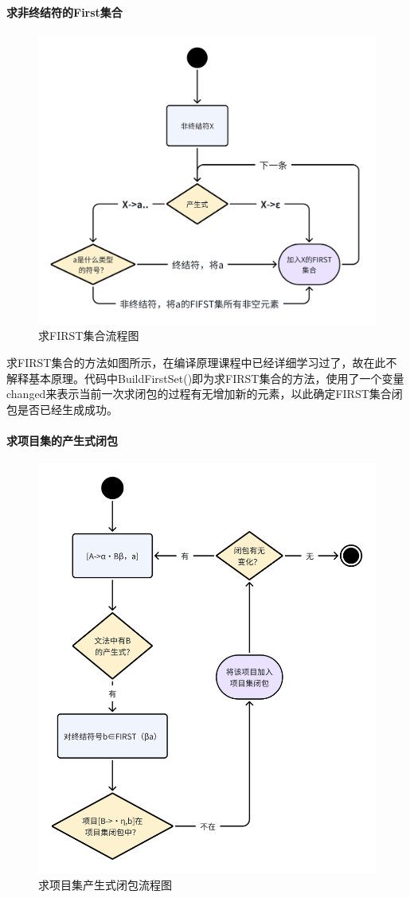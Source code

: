\documentclass[../main.tex]{subfiles}
\begin{document}
\paragraph{求非终结符的First集合}
\begin{figure}[h]
\centering
\includegraphics[width=0.8\linewidth]{assets/FIRST流程图.png}
\caption{求FIRST集合流程图}
\label{fig:求FIRST集合流程图}
\end{figure}

求FIRST集合的方法如图所示，在编译原理课程中已经详细学习过了，故在此不解释基本原理。代码中BuildFirstSet()即为求FIRST集合的方法，使用了一个变量changed来表示当前一次求闭包的过程有无增加新的元素，以此确定FIRST集合闭包是否已经生成成功。

\paragraph{求项目集的产生式闭包}
\begin{figure}[h]
\centering
\includegraphics[width=0.5\linewidth]{assets/项目集闭包流程图.png}
\caption{求项目集产生式闭包流程图}
\label{fig:求项目集产生式闭包流程图}
\end{figure}
\end{document}
